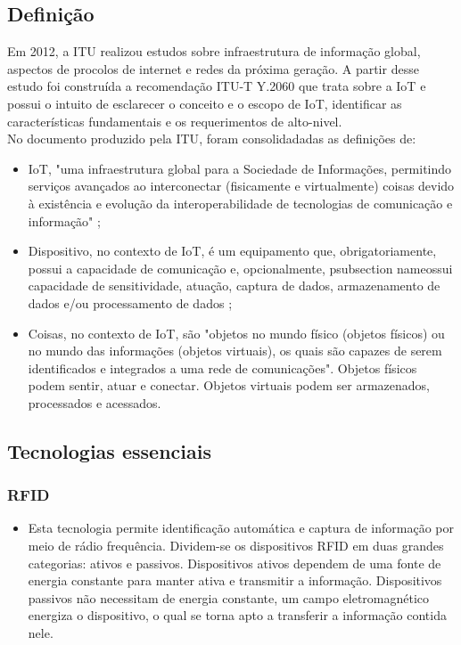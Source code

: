 \subsection{Definição}
	Em 2012, a \acrfull{ITU} realizou estudos sobre infraestrutura
	de informação global, aspectos de procolos de internet e redes da próxima geração.
	A partir desse estudo foi construída a recomendação ITU-T Y.2060 \cite{ITU} que trata sobre a \acrlong{IoT}
	e possui o intuito de esclarecer o conceito e o escopo de \acrshort{IoT}, identificar
	as características fundamentais e os requerimentos de alto-nivel.
\\	No documento produzido pela \acrshort{ITU}, foram consolidadadas as definições de:
	\begin{itemize}
		\item \acrlong{IoT}, "uma infraestrutura global para a Sociedade de Informações, permitindo serviços avançados ao
		interconectar (fisicamente e virtualmente) coisas devido à existência e evolução da interoperabilidade
	de tecnologias de comunicação e informação" \cite{ITU};
		\item Dispositivo, no contexto de \acrshort{IoT}, é um equipamento que, obrigatoriamente, possui a capacidade
		de comunicação e, opcionalmente, psubsection nameossui capacidade de sensitividade, atuação, captura de dados,
		armazenamento de dados e/ou processamento de dados \cite{ITU};
		\item Coisas, no contexto de \acrshort{IoT}, são "objetos
	no mundo físico (objetos físicos) ou no mundo das informações (objetos virtuais), os quais são capazes
	de serem identificados e integrados a uma rede de comunicações". Objetos físicos podem sentir, atuar e conectar.
	Objetos virtuais podem ser armazenados, processados e acessados.\cite{ITU}
	\end{itemize}
\subsection{Tecnologias essenciais}
	\subsubsection{\acrfull{RFID}}
		\begin{itemize}
			\item Esta tecnologia permite identificação automática e captura de informação por meio de rádio frequência.
			Dividem-se os dispositivos \acrshort{RFID} em duas grandes categorias: ativos e passivos. Dispositivos ativos dependem
			de uma fonte de energia constante para manter ativa e transmitir a informação. Dispositivos passivos não necessitam de energia constante,
			um campo eletromagnético energiza o dispositivo, o qual se torna apto a transferir a informação contida nele.
			\cite{refrfid}
		\end{itemize}
